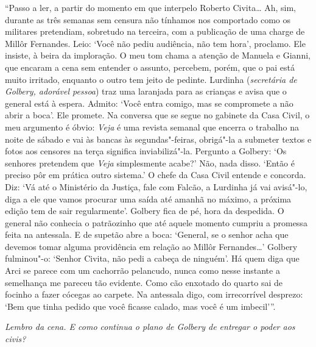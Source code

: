 ``Passo a ler, a partir do momento em que interpelo Roberto
Civita… Ah, sim, durante as três semanas sem censura não tínhamos
nos comportado como os militares pretendiam, sobretudo na terceira, com
a publicação de uma charge de Millôr Fernandes. Leio: `Você não pediu
audiência, não tem hora', proclamo. Ele insiste, à beira da imploração.
O meu tom chama a atenção de Manuela e Gianni, que encaram a cena sem
entender o assunto, percebem, porém, que o pai está muito irritado,
enquanto o outro tem jeito de pedinte. Lurdinha (\emph{secretária de
Golbery, adorável pessoa}) traz uma laranjada para as crianças e avisa
que o general está à espera. Admito: `Você entra comigo, mas se
compromete a não abrir a boca'. Ele promete. Na conversa que se segue no
gabinete da Casa Civil, o meu argumento é óbvio: \emph{Veja} é uma
revista semanal que encerra o trabalho na noite de sábado e vai às
bancas às segundas"-feiras, obrigá"-la a submeter textos e fotos aos
censores na terça significa inviabilizá"-la. Pergunto a Golbery: `Os
senhores pretendem que \emph{Veja} simplesmente acabe?' Não, nada disso.
`Então é preciso pôr em prática outro sistema.' O chefe da Casa Civil
entende e concorda. Diz: `Vá até o Ministério da Justiça, fale com
Falcão, a Lurdinha já vai avisá"-lo, diga a ele que vamos procurar uma
saída até amanhã no máximo, a próxima edição tem de sair regularmente'.
Golbery fica de pé, hora da despedida. O general não conhecia o
patrãozinho que até aquele momento cumpriu a promessa feita na
antessala. E de supetão abre a boca: `General, se o senhor acha que
devemos tomar alguma providência em relação ao Millôr Fernandes…'
Golbery fulminou"-o: `Senhor Civita, não pedi a cabeça de ninguém'. Há
quem diga que Arci se parece com um cachorrão pelancudo, nunca como
nesse instante a semelhança me pareceu tão evidente. Como cão enxotado
do quarto sai de focinho a fazer cócegas ao carpete. Na antessala digo,
com irrecorrível desprezo: `Bem que tinha pedido que você ficasse
calado, mas você é um imbecil'''.

\itshape
 Lembro da cena. E como continua o plano de Golbery de
entregar o poder aos civis?

